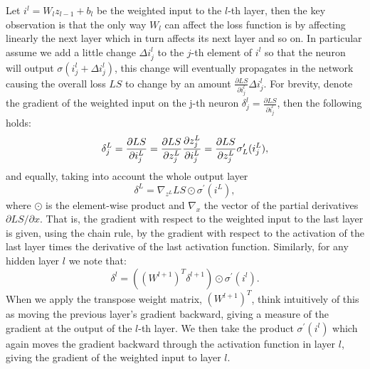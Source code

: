 \documentclass[LaM,binding=0.6cm]{./packages/sapthesis/sapthesis}
\begin{document}
               Let $i^l = W_l z_{l-1} + b_l$ be the weighted input to the $l$-th layer, then the key observation is that the only way $ W_l $ can affect the loss function is by affecting linearly
               the next layer which in turn affects its next layer and so on. In particular assume we add a little change $\Delta i_{j}^{l} $ to the $j$-th 
               element of $ i^l $ so that the neuron will output $ \sigma \left(i_{j}^{l} + \Delta i_{j}^{l}\right) $, this change will
               eventually propagates in the network causing the overall loss $LS$ to change by an amount $\frac{\partial LS}{\partial i_{j}^{l}} \Delta i_{j}^{l}$. For brevity,
               denote the gradient of the weighted input on the j-th neuron $ \delta^{l}_{j} = \frac{\partial LS}{\partial i^{l}_{j}} $, then the following holds:
               \begin{equation}
                 \delta^{L}_{j} = \frac{\partial LS}{\partial i^{L}_{j}} = \frac{\partial LS}{\partial z^{L}_{j}}\frac{\partial z^{L}_{j}}{\partial i^{L}_{j}} \\
                                =\frac{\partial LS}{\partial z^{L}_{j}} \sigma_{L}^{\prime}(i^{L}_{j}),
               \end{equation}
               and equally, taking into account the whole output layer
               \begin{equation}
                    \label{bp1}
                    \delta^{L}=\nabla_{z^L} LS \odot \sigma^{\prime}(i^{L}),
               \end{equation}
               where $ \odot $ is the element-wise product and $ \nabla_{x} $ the vector of the partial derivatives $ \partial LS / \partial x $. 
               That is, the gradient with respect to the weighted input to the last layer is given, using the chain rule, by the gradient with respect to the activation of the last layer times the derivative
               of the last activation function. Similarly, for any hidden layer $ l $ we note that:
               \begin{equation}
                \label{bp2}
                    \delta^{l}=\left((W^{l+1})^{T} \delta^{l+1}\right) \odot \sigma^{\prime}(i^{l}).
                \end{equation}
                When we apply the transpose weight matrix, $(W^{l+1})^{T}$, think intuitively of this as moving the previous layer's gradient backward, giving a measure of the gradient at the output of the $l$-th layer. 
                We then take the product $\sigma^{\prime}(i^{l})$ which again moves the gradient backward through the activation function in layer $l$, giving the gradient of the weighted input to layer $l$.
\end{document}

